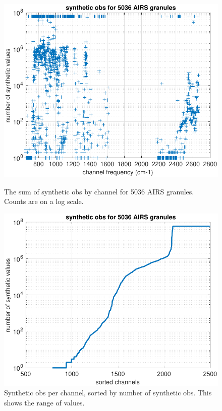 \documentclass[12pt]{article}
\begin{document}
\begin{figure}
  \centering
  \begin{minipage}[t]{0.45\textwidth}
    \centering
    \includegraphics[width=\textwidth]{figures/synth_obs_freq_order.pdf}
    \caption{The sum of synthetic obs by channel for 5036 AIRS
      granules.  Counts are on a log scale.}
    \label{fig7}
  \end{minipage}\hfill
  \begin{minipage}[t]{0.45\textwidth}
    \centering
    \includegraphics[width=\textwidth]{figures/synthetic_obs_counts.pdf}
    \caption{Synthetic obs per channel, sorted by number of
      synthetic obs.  This shows the range of values.}
    \label{fig8}
  \end{minipage}
\end{figure}
\end{document}

